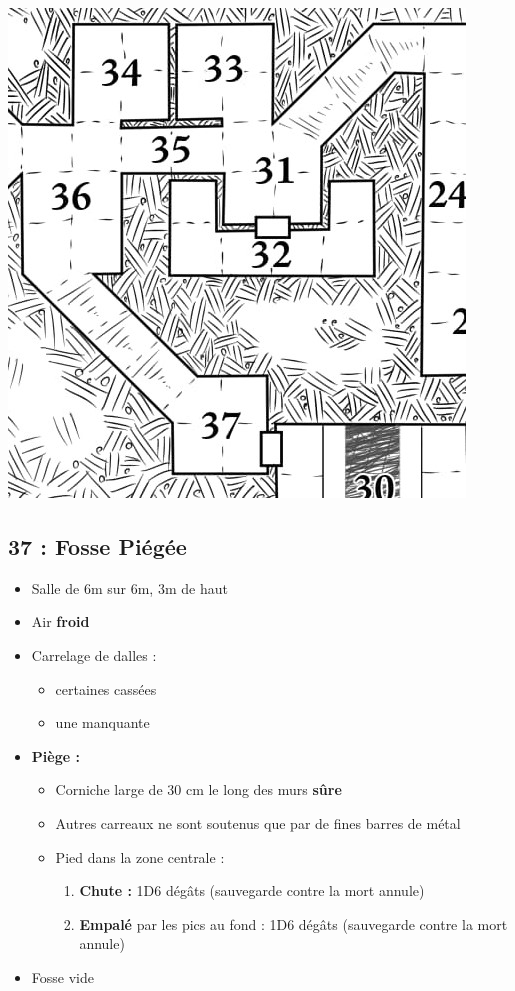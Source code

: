 \vfill
\pagebreak
\includegraphics[width=\columnwidth]{pics/map_31-37.jpg}
\subsection{37 : Fosse Piégée}\label{n3:s37}
\begin{itemize}
  \item Salle de 6m sur 6m, 3m de haut 
  \item Air \textbf{froid}
  \item Carrelage de dalles : 
  \begin{itemize}
    \item certaines cassées
    \item une manquante
  \end{itemize}
  \item \textbf{Piège :}
  \begin{itemize}
    \item Corniche large de 30 cm le long des murs \textbf{sûre}
    \item Autres carreaux ne sont soutenus que par de fines barres de métal
    \item Pied dans la zone centrale :
    \begin{enumerate}
      \item \textbf{Chute :} 1D6 dégâts (sauvegarde contre la mort annule)
      \item \textbf{Empalé} par les pics au fond : 1D6 dégâts (sauvegarde contre la mort annule)
    \end{enumerate}
  \end{itemize}
  \item Fosse vide
\end{itemize}

